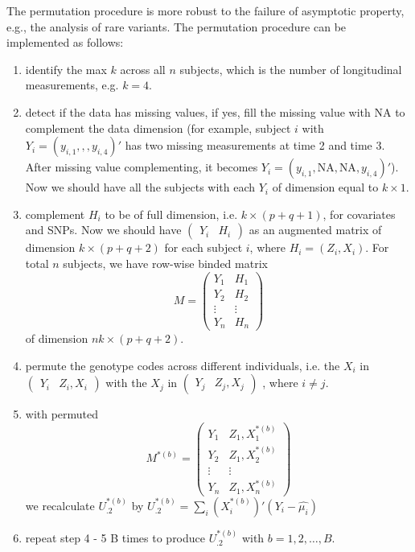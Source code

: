 \documentclass[compress]{beamer}
\begin{document}
{\framebreak
The permutation procedure is more robust to the failure of asymptotic property, e.g., the analysis of rare variants. The permutation procedure can be implemented as follows:
\begin{enumerate}
\item identify the max $k$ across all $n$ subjects, which is the number of longitudinal measurements, e.g. $k = 4$.
\item detect if the data has missing values, if yes, fill the missing value with NA to complement the data dimension (for example, subject $i$ with $Y_{i} = ( y_{i,1},,,y_{i,4} )'$ has two missing measurements at time 2 and time 3. After missing value complementing, it becomes $Y_{i} = ( y_{i,1},\textrm{NA},\textrm{NA},y_{i,4} )'$). Now we should have all the subjects with each $Y_{i}$ of dimension equal to $k \times 1$.  
\item complement $H_i$ to be of full dimension, i.e. $k \times (p + q + 1)$, for covariates and SNPs. Now we should have
$\begin{pmatrix}
Y_i & H_i
\end{pmatrix}$
as an augmented matrix of dimension $k \times (p + q + 2)$ for each subject $i$, where $H_i = (Z_i,X_i)$. For total $n$ subjects, we have row-wise binded matrix
$$
M = 
\begin{pmatrix}
Y_1 & H_1\\
Y_2 & H_2\\
\vdots & \vdots\\
Y_n & H_n
\end{pmatrix}
$$ 
of dimension $nk \times (p + q + 2)$.
\item permute the genotype codes across different individuals, i.e. the $X_i$ in
$\begin{pmatrix}
Y_i & Z_i,X_i
\end{pmatrix}$ 
with the $X_j$ in 
$\begin{pmatrix}
Y_j & Z_j,X_j
\end{pmatrix}$
, where $i \neq j$. 
\item with permuted 
$$
M^{*(b)} = 
\begin{pmatrix}
Y_1 & Z_1, X_1^{*(b)}\\
Y_2 & Z_1, X_2^{*(b)}\\
\vdots & \vdots\\
Y_n & Z_1, X_n^{*(b)}
\end{pmatrix}
$$
we recalculate $ U_{.2}^{ *(b) } $ by  $U_{.2}^{ *(b) } = \sum_{i} (X_{i} ^ { *(b) })' (Y_{i}-\hat{\mu_{i}})$
\item repeat step 4 - 5 B times to produce $U_{.2}^{ *(b) }$ with $b = 1,2,\ldots,B$.
\end{enumerate}


}
\end{document}
